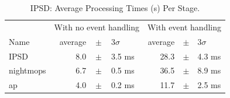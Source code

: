 \begin{table}[htbp]
\begin{center}
\caption{IPSD: Average Processing Times (s) Per Stage. 
\label{tbl:stageoverhead}}
\vspace{\baselineskip}
\begin{tabular}{l|crcl|crcl}
\hline\hline
      & \multicolumn{4}{c|}{With no event handling} 
      & \multicolumn{4}{c}{With event handling} \\
Name  & \multicolumn{2}{r}{average} &$\pm$& \multicolumn{1}{l|}{$3\sigma$}
      & \multicolumn{2}{r}{average} &$\pm$& \multicolumn{1}{l}{$3\sigma$} \\
\hline
IPSD      && 8.0 &$\pm$& 3.5 ms&& 28.3 &$\pm$& 4.3 ms \\ 
nightmops && 6.7 &$\pm$& 0.5 ms&& 36.5 &$\pm$& 8.9 ms \\
ap        &\hfil& 4.0 &$\pm$& 0.2 ms&& 11.7 &$\pm$& 2.5 ms \\ 
\hline
\end{tabular}
\end{center}
\end{table}

